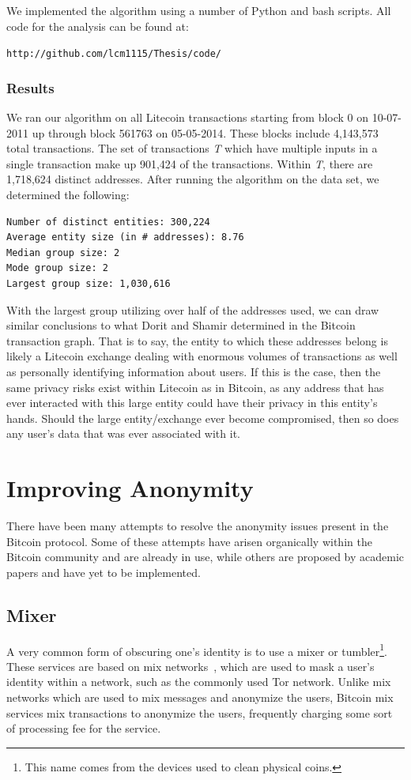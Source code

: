 \documentclass[11pt]{article}
\begin{document}
We implemented the algorithm using a number of Python and bash scripts. All code for the analysis can be found at:
    \begin{center} \texttt{http://github.com/lcm1115/Thesis/code/} \end{center}

\subsubsection{Results}
We ran our algorithm on all Litecoin transactions starting from block 0 on 10-07-2011 up through block 561763 on
05-05-2014. These blocks include 4,143,573 total transactions. The set of transactions \emph{T} which have multiple
inputs in a single transaction make up 901,424 of the transactions. Within \emph{T}, there are 1,718,624 distinct
addresses. After running the algorithm on the data set, we determined the following:
\begin{verbatim}
Number of distinct entities: 300,224
Average entity size (in # addresses): 8.76
Median group size: 2
Mode group size: 2
Largest group size: 1,030,616
\end{verbatim}

With the largest group utilizing over half of the addresses used, we can draw similar conclusions to what Dorit and
Shamir determined in the Bitcoin transaction graph. That is to say, the entity to which these addresses belong is likely
a Litecoin exchange dealing with enormous volumes of transactions as well as personally identifying information about
users\cite{ron13}. If this is the case, then the same privacy risks exist within Litecoin as in Bitcoin, as any address
that has ever interacted with this large entity could have their privacy in this entity's hands.  Should the large
entity/exchange ever become compromised, then so does any user's data that was ever associated with it.

\section{Improving Anonymity}
There have been many attempts to resolve the anonymity issues present in the Bitcoin protocol. Some of these attempts
have arisen organically within the Bitcoin community and are already in use, while others are proposed by academic
papers and have yet to be implemented.

\subsection{Mixer}
A very common form of obscuring one's identity is to use a mixer or tumbler\footnote{This name comes from the devices
used to clean physical coins.}.  These services are based on mix networks~\cite{chaum81}, which are used to mask a
user's identity within a network, such as the commonly used Tor network.  Unlike mix networks which are used to mix
messages and anonymize the users, Bitcoin mix services mix transactions to anonymize the users, frequently charging some
sort of processing fee for the service.
\end{document}
